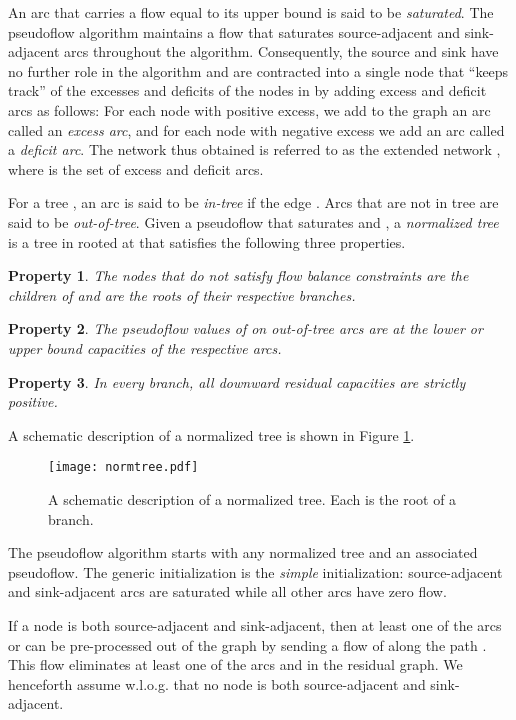 \documentclass{article}
\newtheorem{property}{Property}[section]
\begin{document}
An arc that carries a flow equal to its upper bound is said to be {\em saturated}.  The pseudoflow algorithm maintains a flow that saturates source-adjacent and sink-adjacent arcs throughout the algorithm. Consequently, the source and sink have no further role in the algorithm and are contracted into a single node  that ``keeps track'' of the excesses and deficits of the nodes in  by adding excess and deficit arcs as follows: For each node  with positive excess, we add to the graph an arc  called an {\em excess arc}, and for each node  with negative excess we add an arc  called a {\em deficit arc}. The network thus obtained is referred to as the extended network , where  is the set of excess and deficit arcs.

For a tree , an arc  is said to be {\em in-tree} if the edge . Arcs that are not in tree are said to be {\em out-of-tree}.  Given a pseudoflow  that saturates  and , a {\em normalized tree} is a tree in  rooted at  that satisfies the following three properties. 
\begin{property}
\label{property:normtreeroot}
The nodes that do not satisfy flow balance constraints are the children of  and are the roots of their respective branches.
\end{property}
\begin{property}
\label{property:normtreeoutoftree}
The pseudoflow values of  on out-of-tree arcs are at the lower or upper bound capacities of the respective arcs.
\end{property}
\begin{property}
\label{property:normtreedownward}
In every branch, all downward residual capacities are strictly positive.
\end{property}
A schematic description of a normalized tree is shown in Figure \ref{Figure:normtree}.

\begin{figure}
\centerline{\texttt{[image: normtree.pdf]}}
\caption{\label{Figure:normtree}A schematic description of a normalized tree. Each  is the root of a branch.}
\end{figure}

The pseudoflow algorithm starts with any normalized tree and an associated pseudoflow.  The generic initialization is the {\em simple} initialization: source-adjacent and sink-adjacent arcs are saturated while all other arcs have zero flow.

If a node  is both source-adjacent and sink-adjacent, then at least one of the arcs  or  can be pre-processed out of the graph by sending a flow of  along the path . This flow eliminates at least one of the arcs  and  in the residual graph. We henceforth assume w.l.o.g. that no node is both source-adjacent and sink-adjacent.
\end{document}

